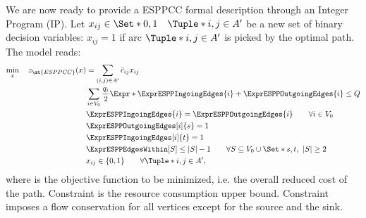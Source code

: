 We are now ready to provide a ESPPCC formal description through an Integer Program (IP).
Let $x_{ij} \in \Set*{0, 1} \quad \Tuple*{i, j} \in A^\prime$ be a new set of binary decision variables:
$x_{ij} = 1$ if arc $\Tuple*{i, j} \in A^\prime$ is picked by the optimal path.
The model reads:
\begin{align}
	\min_{x} \quad z_\mt{ESPPCC}(x) & =  \sum_{(i, j) \in A^\prime} \bar{c}_{ij} x_{ij}                                                     \label{eq:espprc-obj-function}                                                                \\
	                                & \sum_{i \in V_0} \frac{q_i}{2} \Expr*{ \ExprESPPIngoingEdges{i} + \ExprESPPOutgoingEdges{i} }  \le Q  \label{eq:espprc-resource-upper-bound-constraint}                                             \\
	                                & \ExprESPPIngoingEdges{i} = \ExprESPPOutgoingEdges{i}                                                  \qquad \forall i \in V_0          \label{eq:espprc-flow-conservation-constraint-customers}    \\
	                                & \ExprESPPOutgoingEdges[i]{s} = 1                                                                      \label{eq:espprc-source-emitting-flow}                                                        \\
	                                & \ExprESPPIngoingEdges[i]{t} = 1                                                                       \label{eq-espprc-sink-consuming-flow}                                                         \\
	                                & \ExprESPPEdgesWithin[S] \le |S| - 1                                                                   \qquad \forall S \subseteq V_0 \cup \Set*{s, t},\ |S| \ge 2 \label{eq:espprc-sec-constraints} \\
	                                & x_{ij}                   \in \lbrace 0, 1 \rbrace                                                     \qquad \forall \Tuple*{i, j} \in A^\prime    \label{eq:espprc-x-mip-var-bounds},
\end{align}
where  is the objective function to be minimized, i.e. the overall reduced cost of the path.
Constraint  is the resource consumption upper bound.
Constraint  imposes a flow conservation for all vertices except for the source and the sink.
